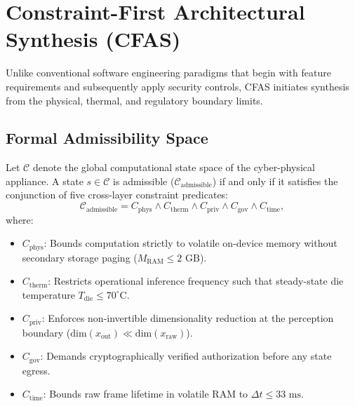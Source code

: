 \documentclass[conference]{IEEEtran}
\begin{document}
\section{Constraint-First Architectural Synthesis (CFAS)}

Unlike conventional software engineering paradigms that begin with feature requirements and subsequently apply security controls, CFAS initiates synthesis from the physical, thermal, and regulatory boundary limits.

\subsection{Formal Admissibility Space}
Let $\mathcal{C}$ denote the global computational state space of the cyber-physical appliance. A state $s \in \mathcal{C}$ is admissible ($\mathcal{C}_{\mathrm{admissible}}$) if and only if it satisfies the conjunction of five cross-layer constraint predicates:
\begin{equation}
\mathcal{C}_{\mathrm{admissible}} = C_{\mathrm{phys}} \land C_{\mathrm{therm}} \land C_{\mathrm{priv}} \land C_{\mathrm{gov}} \land C_{\mathrm{time}},
\label{eq:cfas_admissibility}
\end{equation}
where:
\begin{itemize}
    \item $C_{\mathrm{phys}}$: Bounds computation strictly to volatile on-device memory without secondary storage paging ($M_{\mathrm{RAM}} \le 2\text{ GB}$).
    \item $C_{\mathrm{therm}}$: Restricts operational inference frequency such that steady-state die temperature $T_{\mathrm{die}} \le 70^\circ\text{C}$.
    \item $C_{\mathrm{priv}}$: Enforces non-invertible dimensionality reduction at the perception boundary ($\text{dim}(x_{\mathrm{out}}) \ll \text{dim}(x_{\mathrm{raw}})$).
    \item $C_{\mathrm{gov}}$: Demands cryptographically verified authorization before any state egress.
    \item $C_{\mathrm{time}}$: Bounds raw frame lifetime in volatile RAM to $\Delta t \le 33\text{ ms}$.
\end{itemize}
\end{document}
